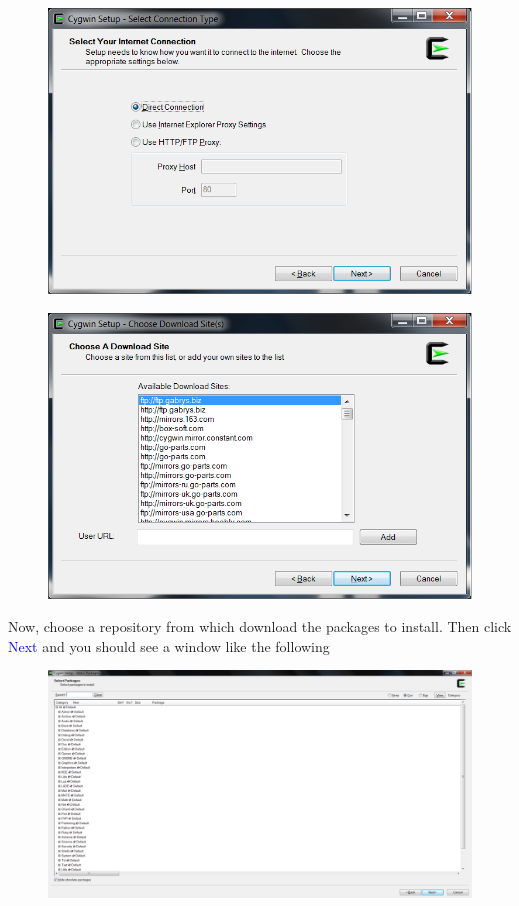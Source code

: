 \pagebreak

\begin{figure}[ht!]
  \centering
  \includegraphics[width=0.7\linewidth]{2015/Aug/25/6pic.png}
\end{figure}
\begin{figure}[h!]
  \centering
  \includegraphics[width=0.7\linewidth]{2015/Aug/25/7pic.png}
\end{figure}

\pagebreak

Now, choose a repository from which download the packages to install. Then click \textcolor{blue}{Next} and you should see a window like the following

\begin{figure}[h]
  \includegraphics[width=\linewidth]{2015/Aug/25/8pic.png}
\end{figure}

